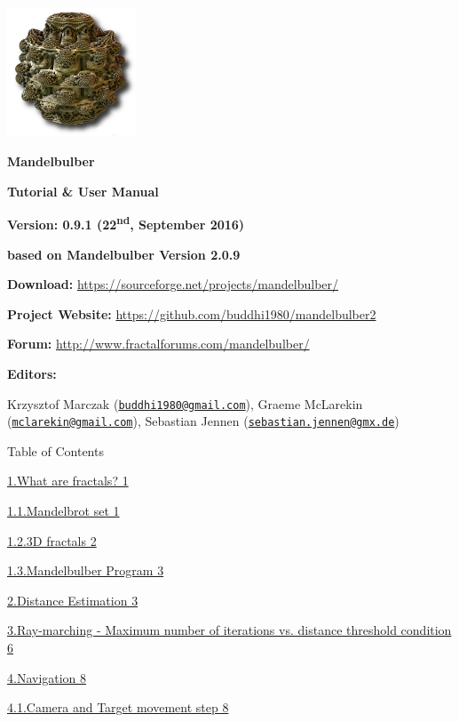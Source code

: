 \includegraphics[width=1.51457in,height=1.51614in]{img/manual/media/image1.png}

\textbf{Mandelbulber}

\textbf{Tutorial \& User Manual}

\textbf{Version: 0.9.1 (22\textsuperscript{nd}, September 2016)}

\textbf{based on Mandelbulber Version 2.0.9}

\textbf{Download:} \url{https://sourceforge.net/projects/mandelbulber/}

\textbf{Project Website:}
\href{http://github.com/buddhi1980/mandelbulber2}{https://github.com/buddhi1980/mandelbulber2}

\textbf{Forum:} \url{http://www.fractalforums.com/mandelbulber/}

\textbf{Editors:}

Krzysztof Marczak
(\href{mailto:buddhi1980@gmail.com}{\nolinkurl{buddhi1980@gmail.com}}),
Graeme McLarekin
(\href{mailto:mclarekin@gmail.com}{\nolinkurl{mclarekin@gmail.com}}),
Sebastian Jennen
(\href{mailto:sebastian.jennen@gmx.de}{\nolinkurl{sebastian.jennen@gmx.de}})

Table of Contents

\protect\hyperlink{what-are-fractals}{1.What are fractals? 1}

\protect\hyperlink{mandelbrot-set}{1.1.Mandelbrot set 1}

\protect\hyperlink{d-fractals}{1.2.3D fractals 2}

\protect\hyperlink{mandelbulber-program}{1.3.Mandelbulber Program 3}

\protect\hyperlink{distance-estimation}{2.Distance Estimation 3}

\protect\hyperlink{ray-marching---maximum-number-of-iterations-vs.-distance-threshold-condition}{3.Ray-marching
- Maximum number of iterations vs. distance threshold condition 6}

\protect\hyperlink{navigation}{4.Navigation 8}

\protect\hyperlink{camera-and-target-movement-step}{4.1.Camera and
Target movement step 8}

